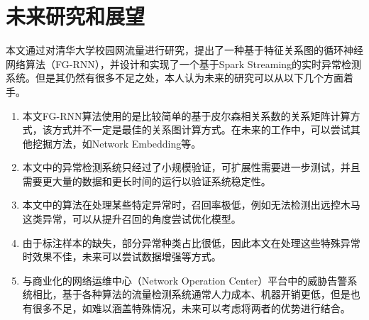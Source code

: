 \section{未来研究和展望}
本文通过对清华大学校园网流量进行研究，提出了一种基于特征关系图的循环神经网络算法（FG-RNN），并设计和实现了一个基于Spark Streaming的实时异常检测系统。但是其仍然有很多不足之处，本人认为未来的研究可以从以下几个方面着手。
\begin{enumerate}
    \item 本文FG-RNN算法使用的是比较简单的基于皮尔森相关系数的关系矩阵计算方式，该方式并不一定是最佳的关系图计算方式。在未来的工作中，可以尝试其他挖掘方法，如Network Embedding等。
    \item 本文中的异常检测系统只经过了小规模验证，可扩展性需要进一步测试，并且需要更大量的数据和更长时间的运行以验证系统稳定性。
    \item 本文中的算法在处理某些特定异常时，召回率极低，例如无法检测出远控木马这类异常，可以从提升召回的角度尝试优化模型。
    \item 由于标注样本的缺失，部分异常种类占比很低，因此本文在处理这些特殊异常时效果不佳，未来可以尝试数据增强等方式。
    \item 与商业化的网络运维中心（Network Operation Center）平台中的威胁告警系统相比，基于各种算法的流量检测系统通常人力成本、机器开销更低，但是也有很多不足，如难以涵盖特殊情况，未来可以考虑将两者的优势进行结合。
\end{enumerate}
